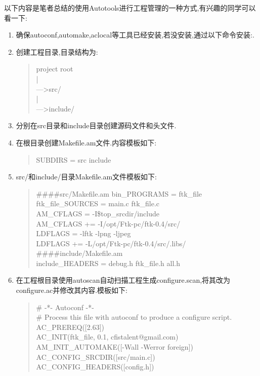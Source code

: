 \documentclass[12pt,a4paper,titlepage]{article}
\begin{document}
以下内容是笔者总结的使用Autotools进行工程管理的一种方式,有兴趣的同学可以看一下:
\begin{enumerate}
\item 确保autoconf,automake,aclocal等工具已经安装,若没安装,通过以下命令安装:.
\item 创建工程目录,目录结构为:
\begin{quote}
project root\\
\indent{}|\\
\indent{}--->src/\\
\indent{}|\\
\indent{}--->include/
\end{quote}
\item 分别在src目录和include目录创建源码文件和头文件.
\item 在根目录创建Makefile.am文件.内容模板如下:
\begin{quote}
SUBDIRS = src include\\
\end{quote}
\item src/和include/目录Makefile.am文件模板如下:
\begin{quote}
\#\#\#\#src/Makefile.am
bin\_PROGRAMS = ftk\_file\\
ftk\_file\_SOURCES = main.c ftk\_file.c\\
AM\_CFLAGS = -I\${top\_srcdir}/include \\
AM\_CFLAGS += -I/opt/Ftk-pc/ftk-0.4/src/\\
LDFLAGS = -lftk -lpng -ljpeg\\
LDFLAGS += -L/opt/Ftk-pc/ftk-0.4/src/.libs/\\
\#\#\#\#include/Makefile.am\\
include\_HEADERS = debug.h ftk\_file.h all.h
\end{quote}
\item 在工程根目录使用autoscan自动扫描工程生成configure.scan,将其改为configure.ac并修改其内容.模板如下:
\begin{quote}
\#            -*- Autoconf -*-\\
\# Process this file with autoconf to produce a configure script.\\
AC\_PREREQ([2.63])\\
AC\_INIT(ftk\_file, 0.1, cfistalent@gmail.com)\\
AM\_INIT\_AUTOMAKE([-Wall -Werror foreign])\\
AC\_CONFIG\_SRCDIR([src/main.c])\\
AC\_CONFIG\_HEADERS([config.h])\\

\end{quote}
\end{enumerate}
\end{document}
